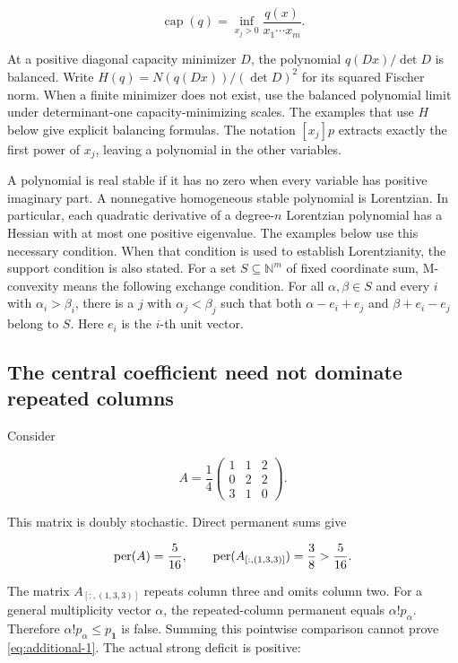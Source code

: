 \[
\operatorname{cap}(q)=\inf_{x_j>0}\frac{q(x)}{x_1\cdots x_m}.
\]

At a positive diagonal capacity minimizer \(D\), the polynomial \(q(Dx)/\det D\) is balanced. Write \(H(q)=N(q(Dx))/(\det D)^2\) for its squared Fischer norm. When a finite minimizer does not exist, use the balanced polynomial limit under determinant-one capacity-minimizing scales. The examples that use \(H\) below give explicit balancing formulas. The notation \([x_j]p\) extracts exactly the first power of \(x_j\), leaving a polynomial in the other variables.

A polynomial is real stable if it has no zero when every variable has positive imaginary part. A nonnegative homogeneous stable polynomial is Lorentzian. In particular, each quadratic derivative of a degree-\(n\) Lorentzian polynomial has a Hessian with at most one positive eigenvalue. The examples below use this necessary condition. When that condition is used to establish Lorentzianity, the support condition is also stated. For a set \(S\subseteq\mathbb N^m\) of fixed coordinate sum, M-convexity means the following exchange condition. For all \(\alpha,\beta\in S\) and every \(i\) with \(\alpha_i>\beta_i\), there is a \(j\) with \(\alpha_j<\beta_j\) such that both \(\alpha-e_i+e_j\) and \(\beta+e_i-e_j\) belong to \(S\). Here \(e_i\) is the \(i\)-th unit vector.

\subsection{The central coefficient need not dominate repeated columns}\label{app:additional-2}

Consider

\[
A=\frac14\begin{pmatrix}1&1&2\\0&2&2\\3&1&0\end{pmatrix}.
\]

This matrix is doubly stochastic. Direct permanent sums give

\[
\operatorname{per}(A)=\frac5{16},\qquad
\operatorname{per}(A_{[:,(1,3,3)]})=\frac38>\frac5{16}.
\]

The matrix \(A_{[:,(1,3,3)]}\) repeats column three and omits column two. For a general multiplicity vector \(\alpha\), the repeated-column permanent equals \(\alpha!p_\alpha\). Therefore \(\alpha!p_\alpha\le p_{\mathbf1}\) is false. Summing this pointwise comparison cannot prove \eqref{eq:additional-1}. The actual strong deficit is positive:

